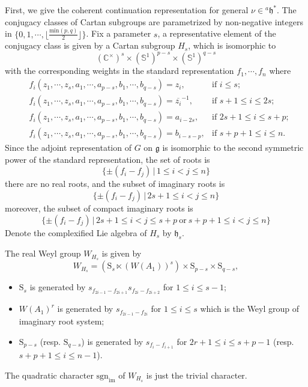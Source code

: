 \documentclass[12pt, a4paper]{amsart}
\numberwithin{equation}{section}
\newcommand{\BC}{{\mathbb {C}}}
\newcommand{\BS}{{\mathbb {S}}}
\newcommand{\fg}{\mathfrak{g}}
\newcommand{\fh}{\mathfrak{h}}
\newcommand{\sgn}{{\mathrm{sgn}}}
\newcommand{\set}[2]{\{#1\,|\,#2\}}
\renewcommand{\bar}{\overline}
\begin{document}
First, we give the coherent continuation representation for general $\nu \in {^{a}\fh^*}$. The conjugacy classes of Cartan subgroups are parametrized by non-negative integers in $\{0,1,\cdots,\lfloor\frac{\mathrm{min}(p,q)}{2}\rfloor\}$. Fix a parameter $s$, a representative element of the conjugacy class is given by a Cartan subgroup $H_s$, which is isomorphic to 
$$(\BC^{\times})^s \times (\BS^1)^{p-s} \times (\BS^1)^{q-s}$$
with the corresponding weights in the standard representation $f_1,\cdots ,f_n$ where
\begin{align}
    & f_{i}(z_1,\cdots,z_s,a_1,\cdots,a_{p-s},b_1,\cdots,b_{q-s}) = z_i, & \textrm{if $i \leq s$};\\
    & f_{i}(z_1,\cdots,z_s,a_1,\cdots,a_{p-s},b_1,\cdots,b_{q-s}) = \bar{z_i}^{-1}, & \textrm{if $s+1 \leq i \leq 2s$};\\
    &f_i(z_1,\cdots,z_s,a_1,\cdots,a_{p-s},b_1,\cdots,b_{q-s}) = a_{i-2s}, & \textrm{if $2s+1 \leq i \leq s+p$};\\
    &f_i(z_1,\cdots,z_s,a_1,\cdots,a_{p-s},b_1,\cdots,b_{q-s}) = b_{i-s-p}, & \textrm{if $s+p+1 \leq i \leq n$}.
\end{align}
Since the adjoint representation of $G$ on $\fg$ is isomorphic to the second symmetric power of the standard representation, the set of roots is 
$$\set{\pm(f_i-f_j)}{1\leq i <j \leq n}$$
there are no real roots, and the subset of imaginary roots is
$$\set{\pm(f_i-f_j)}{2s+1 \leq i < j \leq n}$$
moreover, the subset of compact imaginary roots is
$$\set{\pm(f_i-f_j)}{2s+1 \leq i < j \leq s+p \  \textrm{or} \ s+p+1 \leq i<j \leq n }$$
Denote the complexified Lie algebra of $H_s$ by $\fh_s$. 

The real Weyl group $W_{H_s}$ is given by
$$W_{H_s} = (\mathrm{S}_s \ltimes  (W(A_1))^s) \times \mathrm{S}_{p-s} \times \mathrm{S}_{q-s},$$

\begin{itemize}
    \item $\mathrm{S}_s$ is generated by $s_{f_{2i-1}-f_{2i+1}}s_{f_{2i}-f_{2i+2}}$ for $1 \leq i \leq s-1$;
    \item $W(A_1)^r$ is generated by $s_{f_{2i-1}-f_{2i}}$ for $1 \leq i \leq s$ which is the Weyl group of imaginary root system;
    \item $\mathrm{S}_{p-s}$ (resp. $\mathrm{S}_{q-s}$) is generated by $s_{f_{i}-f_{i+1}}$ for $2r+1 \leq i \leq s+p-1$ (resp. $s+p+1 \leq i \leq n-1$).
\end{itemize}

The quadratic character $\sgn_{\mathrm{im}}$ of $W_{H_{s}}$ is just the trivial character.
\end{document}
